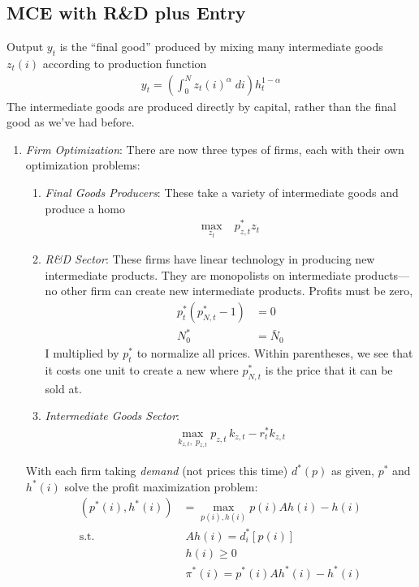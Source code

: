 \documentclass[12pt]{article}
\theoremstyle{plain}
\theoremstyle{definition}
\theoremstyle{remark}
\newcommand{\intzN}{\int_0^N}
\begin{document}
\clearpage
\subsection{MCE with R\&D plus Entry}

Output $y_t$ is the ``final good'' produced by mixing many intermediate
goods $z_t(i)$ according to production function
\begin{align*}
  y_t = \left( \intzN z_t(i)^\alpha \; di \right) h_t^{1-\alpha}
\end{align*}
The intermediate goods are produced directly by capital, rather than the
final good as we've had before.
\begin{enumerate}
  \item \emph{Firm Optimization}:
    There are now three types of firms, each with their own optimization
    problems:
    \begin{enumerate}
      \item \emph{Final Goods Producers}:
        These take a variety of intermediate goods and produce a homo
        \begin{align*}
          \max_{z_t} \; & p^*_{z,t} z_t
        \end{align*}

      \item \emph{R\&D Sector}: These firms have linear technology in
        producing new intermediate products. They are monopolists on
        intermediate products---no other firm can create new
        intermediate products. Profits must be zero,
        \begin{align*}
          p_t^* (p_{N,t}^*-1) &= 0 \\
          N_0^* &= \bar{N}_0
        \end{align*}
        I multiplied by $p_t^*$ to normalize all prices. Within
        parentheses, we see that it costs one unit to create a new where
        $p_{N,t}^*$ is the price that it can be sold at.

      \item \emph{Intermediate Goods Sector}:
        \begin{align*}
          \max_{k_{z,t}, \; p_{z,t}}
          p_{z,t} \, k_{z,t}
          - r_t^* k_{z,t}
        \end{align*}

    \end{enumerate}
    With each firm taking \emph{demand}
    (not prices this time) $d^*(p)$ as given, $p^*$ and $h^*(i)$
    solve the profit maximization problem:
    \begin{align*}
      (p^*(i),h^*(i))
      &=
      \max_{p(i),h(i)}
      p(i) Ah(i) - h(i) \\
      \text{s.t.} \;
      & \; Ah(i) = d_i^*[p(i)] \\
      & \; h(i) \geq 0\\
      & \; \pi^*(i) = p^*(i) Ah^*(i) - h^*(i)
    \end{align*}


\end{enumerate}
\end{document}
